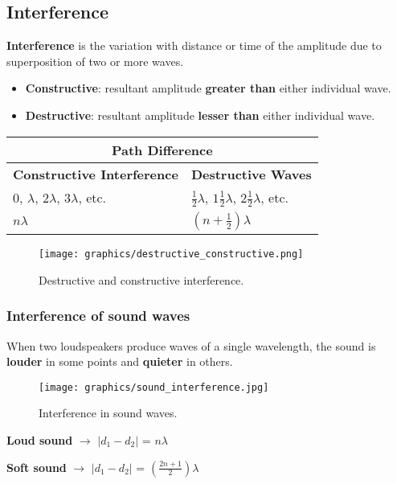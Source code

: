 \documentclass[12pt,a4paper]{article}
\begin{document}
\subsection{Interference}
\textbf{Interference} is the variation with distance or time of the amplitude due to superposition of two or more waves.
\begin{itemize}
    \item \textbf{Constructive}: resultant amplitude \textbf{greater than} either individual wave.
    \item \textbf{Destructive}: resultant amplitude \textbf{lesser than} either individual wave.
\end{itemize}  
\begin{center}
\begin{tabular}{ | l | l | } 
 \hline
 \multicolumn{2}{|c|}{\textbf{Path Difference}}\\
 \hline
\hline
 \textbf{Constructive Interference} & \textbf{Destructive Waves}\\ 
\hline
 $0$, $\lambda$, $2\lambda$, $3\lambda$, etc. & $\frac{1}{2}\lambda$, $1\frac{1}{2}\lambda$, $2\frac{1}{2}\lambda$, etc.\\ 
\hline
 $n\lambda$ & $(n + \frac{1}{2})\lambda$\\
\hline
\end{tabular}
\end{center}

\begin{figure}[h]
\texttt{[image: graphics/destructive\_constructive.png]}
\centering
\caption{Destructive and constructive interference.}
\end{figure}

\subsubsection{Interference of sound waves}
When two loudspeakers produce waves of a single wavelength, the sound is \textbf{louder} in some points and \textbf{quieter} in others. 

\begin{figure}[h]
\texttt{[image: graphics/sound\_interference.jpg]}
\centering
\caption{Interference in sound waves.}
\end{figure}

\bigskip \noindent
\textbf{Loud sound}	$\rightarrow$ $|d_1 - d_2|$ = $n\lambda$

\smallskip \noindent
\textbf{Soft sound}	$\rightarrow$ $|d_1 - d_2|$ = $(\frac{2n + 1}{2})\lambda$
\end{document}
